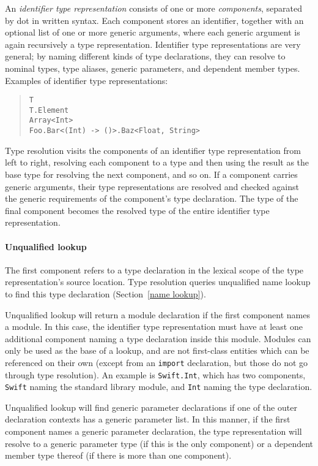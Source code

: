 \documentclass[../generics]{subfiles}
\begin{document}
An \emph{identifier type representation} consists of one or more \emph{components}, separated by dot in written syntax. Each component stores an identifier, together with an optional list of one or more generic arguments, where each generic argument is again recursively a type representation. Identifier type representations are very general; by naming different kinds of type declarations, they can resolve to nominal types, type aliases, generic parameters, and dependent member types. Examples of identifier type representations:
\begin{quote}
\begin{verbatim}
T
T.Element
Array<Int>
Foo.Bar<(Int) -> ()>.Baz<Float, String>
\end{verbatim}
\end{quote}
Type resolution visits the components of an identifier type representation from left to right, resolving each component to a type and then using the result as the base type for resolving the next component, and so on. If a component carries generic arguments, their type representations are resolved and checked against the generic requirements of the component's type declaration. The type of the final component becomes the resolved type of the entire identifier type representation.

\paragraph{Unqualified lookup} The first component refers to a type declaration in the lexical scope of the type representation's source location. Type resolution queries unqualified name lookup to find this type declaration (Section~\ref{name lookup}).

Unqualified lookup will return a module declaration if the first component names a module. In this case, the identifier type representation must have at least one additional component naming a type declaration inside this module. Modules can only be used as the base of a lookup, and are not first-class entities which can be referenced on their own (except from an \texttt{import} declaration, but those do not go through type resolution). An example is \texttt{Swift.Int}, which has two components, \texttt{Swift} naming the standard library module, and \texttt{Int} naming the type declaration. 

Unqualified lookup will find generic parameter declarations if one of the outer declaration contexts has a generic parameter list. In this manner, if the first component names a generic parameter declaration, the type representation will resolve to a generic parameter type (if this is the only component) or a dependent member type thereof (if there is more than one component).
\end{document}
